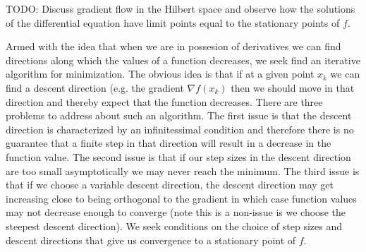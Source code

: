 TODO: Discuss gradient flow in the Hilbert space and observe how the
solutions of the differential equation have limit points equal to the
stationary points of $f$.

Armed with the idea that when we are in possesion of derivatives we can
find directions along which the values of a function decreases, we
seek find an iterative algorithm for minimization.  The obvious idea
is that if at a given point $x_k$ we can find a descent direction
(e.g. the gradient $\nabla f(x_k)$ then we should move in that
direction and thereby expect that the function decreases.  There are
three problems to address about such an algorithm.  The first issue is
that the descent direction is characterized by an infinitessimal
condition and therefore there is no guarantee that a finite step in
that direction will result in a decrease in the function value.  The
second issue is that if our step sizes in the descent direction are
too small asymptotically we may never reach the minimum.  The third
issue is that if we choose a variable descent direction, the descent
direction may get increasing close to being orthogonal to the gradient
in which case function values may not decrease enough to converge
(note this is a non-issue is we choose the steepest descent direction).  We
seek conditions on the choice of step sizes and descent directions
that give us convergence to a stationary point of $f$.



